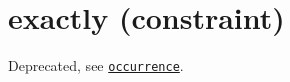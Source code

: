\section{exactly (constraint)}\label{exactly:exactlyconstraint}\hypertarget{exactly:exactlyconstraint}{}
Deprecated, see \hyperlink{occurrence:occurrenceconstraint}{\texttt{occurrence}}.
